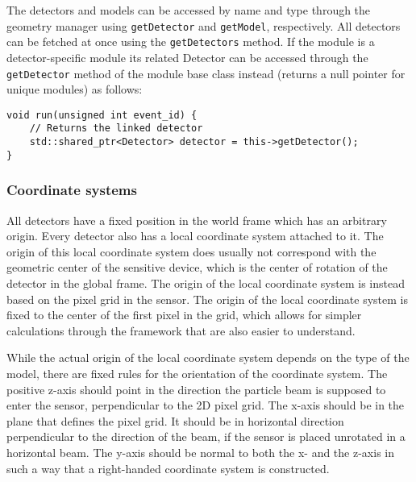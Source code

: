 The detectors and models can be accessed by name and type through the geometry manager using \texttt{getDetector} and \texttt{getModel}, respectively.
All detectors can be fetched at once using the \texttt{getDetectors} method.
If the module is a detector-specific module its related Detector can be accessed through the \texttt{getDetector} method of the module base class instead (returns a null pointer for unique modules) as follows:
\begin{verbatim}
void run(unsigned int event_id) {
    // Returns the linked detector
    std::shared_ptr<Detector> detector = this->getDetector();
}
\end{verbatim}

\subsubsection{Coordinate systems}
All detectors have a fixed position in the world frame which has an arbitrary origin.
Every detector also has a local coordinate system attached to it.
The origin of this local coordinate system does usually not correspond with the geometric center of the sensitive device, which is the center of rotation of the detector in the global frame.
The origin of the local coordinate system is instead based on the pixel grid in the sensor.
The origin of the local coordinate system is fixed to the center of the first pixel in the grid, which allows for simpler calculations through the framework that are also easier to understand.

While the actual origin of the local coordinate system depends on the type of the model, there are fixed rules for the orientation of the coordinate system.
The positive z-axis should point in the direction the particle beam is supposed to enter the sensor, perpendicular to the 2D pixel grid.
The x-axis should be in the plane that defines the pixel grid.
It should be in horizontal direction perpendicular to the direction of the beam, if the sensor is placed unrotated in a horizontal beam.
The y-axis should be normal to both the x- and the z-axis in such a way that a right-handed coordinate system is constructed.

